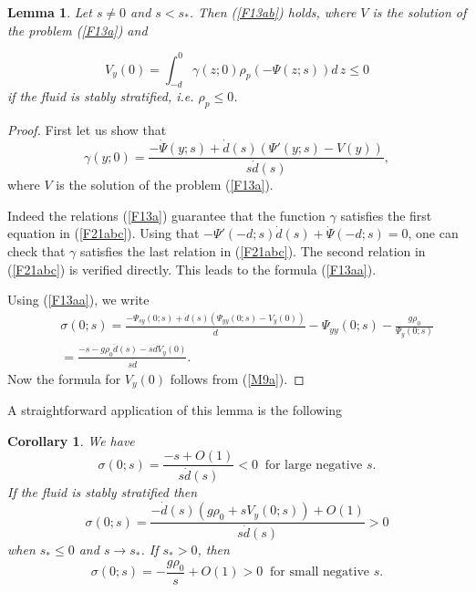 \documentclass[a4paper,reqno,12pt]{amsart}
\theoremstyle{plain}
\newtheorem{lemma}[theorem]{Lemma}
\newtheorem{corollary}[theorem]{Corollary}
\theoremstyle{definition}
\numberwithin{equation}{section}
\begin{document}
\begin{lemma} Let $s\neq 0$ and $s<s_*$. Then (\ref{F13ab}) holds,
where $V$ is the solution of the problem (\ref{F13a}) and

\begin{equation}\label{F18b}
V_y(0)=\int_{-d}^0\gamma(z;0)\rho_p(-\Psi(z;s))d\,z\leq 0
\end{equation}
if the fluid is stably stratified, i.e. $\rho_p\leq 0$.
\end{lemma}

\begin{proof} First let us show that
\begin{equation}\label{F13aa}
\gamma(y;0)=\frac{-\dot{\Psi}(y;s)+\dot{d}(s)(\Psi'(y;s)-V(y))}{s\dot{d}(s)},
\end{equation}
where $V$ is the solution of the problem (\ref{F13a}).

Indeed the relations (\ref{F13a}) guarantee that the function $\gamma $ satisfies the first equation in (\ref{F21abc}). Using that $-\Psi'(-d;s)\dot{d}(s)+\dot{\Psi}(-d;s)=0$, one can check that $\gamma$ satisfies the last relation in (\ref{F21abc}). The second relation in (\ref{F21abc}) is verified directly. This leads to the formula (\ref{F13aa}).

Using (\ref{F13aa}), we write
\begin{eqnarray*}
&&\sigma(0;s)=\frac{-\Psi_{sy}(0;s)+\dot{d}(s)(\Psi_{yy}(0;s)-V_y(0))}{\dot{d}}
-\Psi_{yy}(0;s)-\frac{g\rho_0}{\Psi_y(0;s)}\\
&&=\frac{-s-g\rho_0\dot{d}(s)-s\dot{d}V_y(0)}{s\dot{d}}.
\end{eqnarray*}
Now the formula for $V_y(0)$ follows from (\ref{M9a}).

\end{proof}

A straightforward application of this lemma is the following

\begin{corollary}\label{CM9a} We have
$$
\sigma(0;s)=\frac{-s+O(1)}{s\dot{d}(s)}<0\;\;\mbox{for large negative $s$}.
$$
If the fluid is stably stratified then
$$
\sigma(0;s)=\frac{-\dot{d}(s)(g\rho_0+sV_y(0;s))+O(1)}{s\dot{d}(s)}>0
$$
when $s_*\leq 0$ and $s\to s_*$.
If $s_*>0$, then
$$
\sigma(0;s)=-\frac{g\rho_0}{s}+O(1)>0\;\;\mbox{for small negative $s$}.
$$
\end{corollary}
\end{document}
